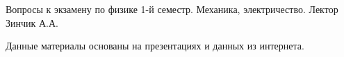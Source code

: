 Вопросы к экзамену по физике 1-й семестр. Механика, электричество. Лектор Зинчик А.А. 

Данные материалы основаны на презентациях и данных из интернета.